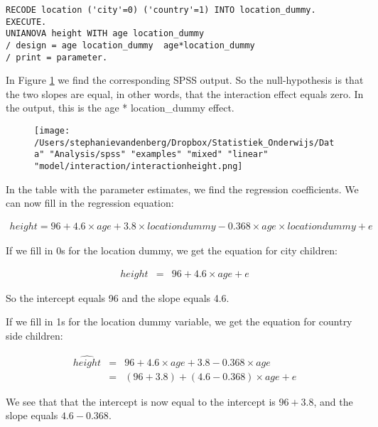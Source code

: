 \begin{verbatim}
RECODE location ('city'=0) ('country'=1) INTO location_dummy.
EXECUTE.
UNIANOVA height WITH age location_dummy 
/ design = age location_dummy  age*location_dummy
/ print = parameter.
\end{verbatim}


In Figure \ref{fig:interactionheight} we find the corresponding SPSS output. So the null-hypothesis is that the two slopes are equal, in other words, that the interaction effect equals zero. In the output, this is the age * location\_dummy effect.


\begin{figure}[h]
    \begin{center}
       \texttt{[image: /Users/stephanievandenberg/Dropbox/Statistiek\_Onderwijs/Data" "Analysis/spss" "examples" "mixed" "linear" "model/interaction/interactionheight.png]}
    \end{center}
    \label{fig:interactionheight}
\end{figure}




In the table with the parameter estimates, we find the regression coefficients. We can now fill in the regression equation:

\begin{eqnarray} 
height = 96 + 4.6 \times age + 3.8  \times locationdummy - 0.368 \times  age \times locationdummy + e \nonumber
\end{eqnarray}


If we fill in 0s for the location dummy, we get the equation for city children:

\begin{eqnarray} 
height &=& 96 + 4.6  \times age  + e  \nonumber
 \end{eqnarray}

So the intercept equals 96 and the slope equals 4.6.

If we fill in 1s for the location dummy variable, we get the equation for country side children:

\begin{eqnarray} 
\widehat{height} &=& 96 + 4.6  \times age + 3.8   - 0.368  \times age  \\ \nonumber
      &=& (96+ 3.8) + (4.6 - 0.368) \times age + e   \nonumber
 \end{eqnarray}

We see that that the intercept is now equal to the intercept is $96+ 3.8$, and the slope equals $4.6-0.368$. 

